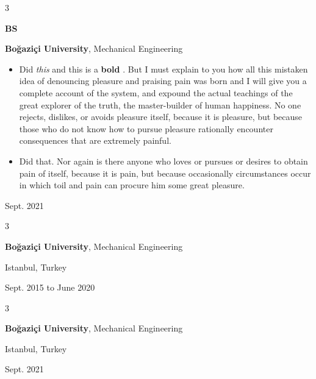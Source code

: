 \documentclass[10pt, letterpaper]{article}
\newenvironment{highlights}{
    \begin{itemize}[
        topsep=0.10 cm,
        parsep=0.10 cm,
        partopsep=0pt,
        itemsep=0pt,
        leftmargin=0.4 cm + 10pt
    ]
}{
    \end{itemize}
} %
\newenvironment{threecolentry}[3][]{
    \onecolentry
    \def\thirdColumn{#3}
    \setcolumnwidth{1 cm, \fill, 4.5 cm}
    \begin{paracol}{3}
    {\raggedright #2} \switchcolumn
}{
    \switchcolumn \raggedleft \thirdColumn
    \end{paracol}
    \endonecolentry
} %
\let\hrefWithoutArrow\href
\renewcommand{\href}[2]{\hrefWithoutArrow{#1}{\mbox{\ifthenelse{\equal{#2}{}}{ }{#2 }\raisebox{.15ex}{\footnotesize \faExternalLink*}}}}
\begin{document}
        \vspace{0.2 cm}

        \begin{threecolentry}{\textbf{BS}}{
            Sept. 2021
        }
            \textbf{Boğaziçi University}, Mechanical Engineering
            \begin{highlights}
                \item Did \textit{this} and this is a \textbf{bold} \href{https://example.com}{link}. But I must explain to you how all this mistaken idea of denouncing pleasure and praising pain was born and I will give you a complete account of the system, and expound the actual teachings of the great explorer of the truth, the master-builder of human happiness. No one rejects, dislikes, or avoids pleasure itself, because it is pleasure, but because those who do not know how to pursue pleasure rationally encounter consequences that are extremely painful.
                \item Did that. Nor again is there anyone who loves or pursues or desires to obtain pain of itself, because it is pain, but because occasionally circumstances occur in which toil and pain can procure him some great pleasure.
            \end{highlights}
        \end{threecolentry}

        \vspace{0.2 cm}

        \begin{threecolentry}{\textbf{}}{
            Istanbul, Turkey

        Sept. 2015 to June 2020
        }
            \textbf{Boğaziçi University}, Mechanical Engineering
        \end{threecolentry}

        \vspace{0.2 cm}

        \begin{threecolentry}{\textbf{}}{
            Istanbul, Turkey

        Sept. 2021
        }
            \textbf{Boğaziçi University}, Mechanical Engineering
        \end{threecolentry}

        \vspace{0.2 cm}
\end{document}
